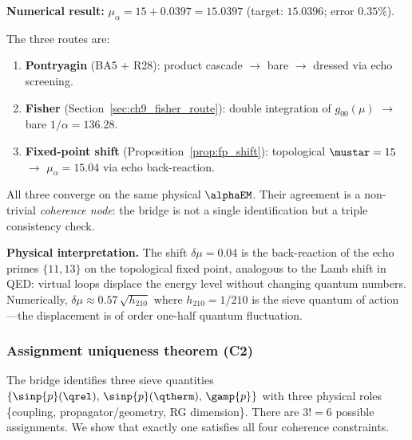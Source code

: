 \documentclass[12pt,a4paper]{article}
\begin{document}
\noindent
\textbf{Numerical result:}
$\mu_\alpha = 15 + 0.0397 = 15.0397$
(target: $15.0396$; error $0.35\%$).

\begin{remark}
\label{rem:three_routes}
The three routes are:
\begin{enumerate}[nosep]
\item \textbf{Pontryagin} (BA5 + R28):
  product cascade $\to$ bare $\to$ dressed via echo screening.
\item \textbf{Fisher} (Section~\ref{sec:ch9_fisher_route}):
  double integration of $g_{00}(\mu)$ $\to$ bare $1/\alpha = 136.28$.
\item \textbf{Fixed-point shift} (Proposition~\ref{prop:fp_shift}):
  topological $\mustar = 15$ $\to$ $\mu_\alpha = 15.04$ via
  echo back-reaction.
\end{enumerate}
All three converge on the same physical $\alphaEM$.  Their agreement
is a non-trivial \emph{coherence node}: the bridge is not a single
identification but a triple consistency check.
\end{remark}

\noindent
\textbf{Physical interpretation.}
The shift $\delta\mu = 0.04$ is the back-reaction of the echo
primes $\{11,13\}$ on the topological fixed point, analogous to
the Lamb shift in QED: virtual loops displace the energy level
without changing quantum numbers.  Numerically,
$\delta\mu \approx 0.57\,\sqrt{h_{210}}$ where $h_{210} = 1/210$
is the sieve quantum of action---the displacement is of order
one-half quantum fluctuation.

\subsubsection{Assignment uniqueness theorem (C2)}
\label{sec:ch9_C2}

The bridge identifies three sieve quantities
$\{\sinp{p}(\qrel),\,\sinp{p}(\qtherm),\,\gamp{p}\}$ with
three physical roles \{coupling, propagator/geometry, RG dimension\}.
There are $3! = 6$ possible assignments.  We show that exactly one
satisfies all four coherence constraints.
\end{document}
